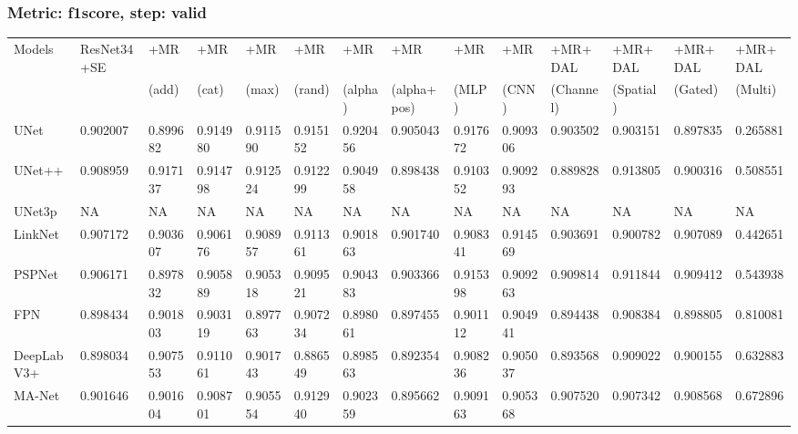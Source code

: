 \documentclass{article}
\begin{document}
\subsubsection{Metric: f1score, step: valid}
\begin{tabular}{llllllllllllll}
\toprule
Models & ResNet34+SE & +MR  & +MR  & +MR  & +MR  & +MR  & +MR  & +MR  & +MR  & +MR+DAL & +MR+DAL & +MR+DAL & +MR+DAL \\
       &             &  (add) &  (cat) &  (max) &  (rand) &  (alpha) &  (alpha+pos) &  (MLP) &  (CNN) & (Channel) & (Spatial) & (Gated) & (Multi) \\
\midrule
UNet & 0.902007 & 0.899682 & 0.914980 & 0.911590 & 0.915152 & 0.920456 & 0.905043 & 0.917672 & 0.909306 & 0.903502 & 0.903151 & 0.897835 & 0.265881 \\
UNet++ & 0.908959 & 0.917137 & 0.914798 & 0.912524 & 0.912299 & 0.904958 & 0.898438 & 0.910352 & 0.909293 & 0.889828 & 0.913805 & 0.900316 & 0.508551 \\
UNet3p & NA & NA & NA & NA & NA & NA & NA & NA & NA & NA & NA & NA & NA \\
LinkNet & 0.907172 & 0.903607 & 0.906176 & 0.908957 & 0.911361 & 0.901863 & 0.901740 & 0.908341 & 0.914569 & 0.903691 & 0.900782 & 0.907089 & 0.442651 \\
PSPNet & 0.906171 & 0.897832 & 0.905889 & 0.905318 & 0.909521 & 0.904383 & 0.903366 & 0.915398 & 0.909263 & 0.909814 & 0.911844 & 0.909412 & 0.543938 \\
FPN & 0.898434 & 0.901803 & 0.903119 & 0.897763 & 0.907234 & 0.898061 & 0.897455 & 0.901112 & 0.904941 & 0.894438 & 0.908384 & 0.898805 & 0.810081 \\
DeepLabV3+ & 0.898034 & 0.907553 & 0.911061 & 0.901743 & 0.886549 & 0.898563 & 0.892354 & 0.908236 & 0.905037 & 0.893568 & 0.909022 & 0.900155 & 0.632883 \\
MA-Net & 0.901646 & 0.901604 & 0.908701 & 0.905554 & 0.912940 & 0.902359 & 0.895662 & 0.909163 & 0.905368 & 0.907520 & 0.907342 & 0.908568 & 0.672896 \\
\bottomrule
\end{tabular}
\end{document}
